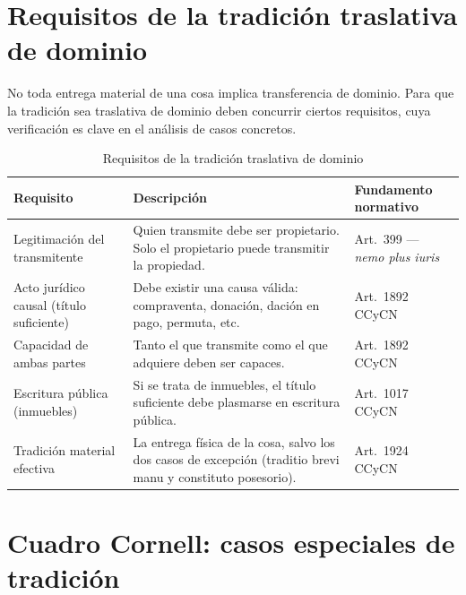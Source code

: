 \documentclass[12pt,oneside]{book}
\begin{document}
\section{Requisitos de la tradición traslativa de dominio}

No toda entrega material de una cosa implica transferencia de dominio. Para que la tradición sea traslativa de dominio deben concurrir ciertos requisitos, cuya verificación es clave en el análisis de casos concretos.

\begin{table}[H]
\centering
\small
\begin{tabularx}{\textwidth}{>{\raggedright\arraybackslash}p{}>{\raggedright\arraybackslash}X>{\raggedright\arraybackslash}p{}}
\toprule
\textbf{Requisito} & \textbf{Descripción} & \textbf{Fundamento normativo} \\
\midrule
Legitimación del transmitente &
Quien transmite debe ser propietario. Solo el propietario puede transmitir la propiedad. &
Art.~399 --- \textit{nemo plus iuris} \\[0.5em]
Acto jurídico causal (título suficiente) &
Debe existir una causa válida: compraventa, donación, dación en pago, permuta, etc. &
Art.~1892 CCyCN \\[0.5em]
Capacidad de ambas partes &
Tanto el que transmite como el que adquiere deben ser capaces. &
Art.~1892 CCyCN \\[0.5em]
Escritura pública (inmuebles) &
Si se trata de inmuebles, el título suficiente debe plasmarse en escritura pública. &
Art.~1017 CCyCN \\[0.5em]
Tradición material efectiva &
La entrega física de la cosa, salvo los dos casos de excepción (traditio brevi manu y constituto posesorio). &
Art.~1924 CCyCN \\
\bottomrule
\end{tabularx}
\caption{Requisitos de la tradición traslativa de dominio}
\end{table}

\section{Cuadro Cornell: casos especiales de tradición}
\end{document}
